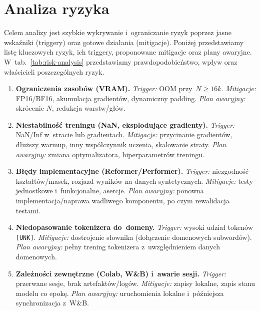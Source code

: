 \documentclass[a4paper,11pt,twoside]{report}
\theoremstyle{definition}
\begin{document}
\section{Analiza ryzyka}

Celem analizy jest szybkie wykrywanie i~ograniczanie ryzyk poprzez jasne wskaźniki (triggery) oraz gotowe działania (mitigacje).
Poniżej przedstawiamy listę kluczowych ryzyk, ich triggery, proponowane mitigacje oraz plany awaryjne. W~tab.~\ref{tab:risk-analysis} przedstawiamy prawdopodobieństwo, wpływ oraz właścicieli poszczególnych ryzyk.

\begin{enumerate}
  \item \textbf{Ograniczenia zasobów (VRAM).}
  \emph{Trigger:} OOM przy~$N\!\geq\!16k$. 
  \emph{Mitigacje:} FP16/BF16, akumulacja gradientów, dynamiczny padding. 
  \emph{Plan awaryjny:} skrócenie $N$, redukcja warstw/głów.

  \item \textbf{Niestabilność treningu (NaN, eksplodujące gradienty).}
  \emph{Trigger:} NaN/Inf w~stracie lub gradientach.  
  \emph{Mitigacje:} przycinanie gradientów, dłuższy warmup, inny współczynnik uczenia, skalowanie straty. 
  \emph{Plan awaryjny:} zmiana optymalizatora, hiperparametrów treningu.

  \item \textbf{Błędy implementacyjne (Reformer/Performer).}
  \emph{Trigger:} niezgodność kształtów/masek, rozjazd wyników na danych syntetycznych. 
  \emph{Mitigacje:} testy jednostkowe i~funkcjonalne, asercje. 
  \emph{Plan awaryjny:} ponowna implementacja/naprawa wadliwego komponentu, po czym rewalidacja testami.

\item \textbf{Niedopasowanie tokenizera do~domeny.}
  \emph{Trigger:} wysoki udział tokenów \texttt{[UNK]}. 
  \emph{Mitigacje:} dostrojenie słownika (dołączenie domenowych subwordów). 
  \emph{Plan awaryjny:} pełny trening tokenizera z~uwzględnieniem danych domenowych.

\item \textbf{Zależności zewnętrzne (Colab, W\&B) i~awarie sesji.}
  \emph{Trigger:} przerwane sesje, brak artefaktów/logów. 
  \emph{Mitigacje:} zapisy lokalne, zapis stanu modelu co epokę. 
  \emph{Plan awaryjny:} uruchomienia lokalne i~późniejsza synchronizacja z~W\&B.

\end{enumerate}
\end{document}
